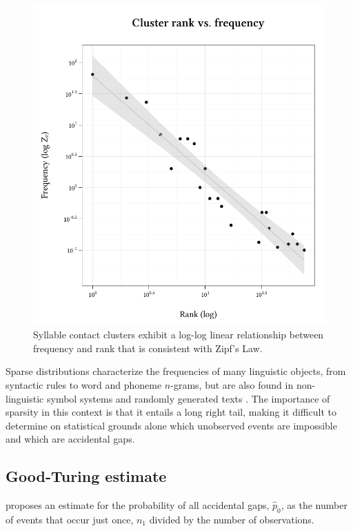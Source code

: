 \begin{figure} \centering
\includegraphics{cluster.pdf}
\caption{Syllable contact clusters exhibit a log-log linear relationship between frequency and rank that is consistent with Zipf's Law.}
\label{clus}
\end{figure}

Sparse distributions characterize the frequencies of many linguistic objects, from syntactic rules \citep{Yang2009} to word \citep{Teahan1998,Baroni2009} and phoneme \citep{Belevitch1956,Daland2011a} $n$-grams, but are also found in non-linguistic symbol systems \citep{Mandelbrot1954,Miller1957,Chomsky1958,Sproat2010} and randomly generated texts \citep{Miller1957,Li1992}. The importance of sparsity in this context is that it entails a long right tail, making it difficult to determine on statistical grounds alone which unobserved events are impossible and which are accidental gaps.

\subsection{Good-Turing estimate}

\citet{Good1953} proposes an estimate for the probability of all accidental gaps, $\hat{p}_0$, as the number of events that occur just once, $n_1$ divided by the number of observations.

